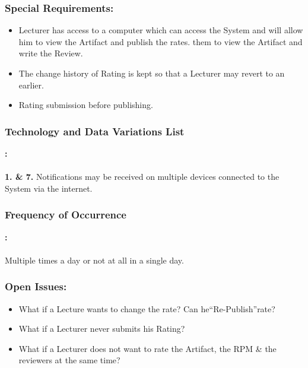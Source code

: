 \subsubsection*{Special Requirements:}
    \begin{itemize}
    \itemsep-1em 
       \item Lecturer has access to a computer which can access the System and will allow him to view the Artifact and publish the rates.
         them to view the Artifact and write the Review.
       \item The change history of Rating is kept so that a Lecturer may revert to an earlier.
       \item Rating submission before publishing.
    \end{itemize}
     

     \subsubsection*{Technology and Data Variations List}\textbf{:}
     \\
     \\
     \textbf{1. \& 7.} Notifications may be received on multiple devices connected to the System via the internet.
      \\
     \subsubsection*{Frequency of Occurrence}\textbf{:}
     \\
     \\
     Multiple times a day or not at all in a single day. 
     
     
     
     \subsubsection*{Open Issues:}
    \begin{itemize}
    \itemsep-1em 
       \item What if a Lecture wants to change the rate? Can he“Re-Publish”rate?
       \item What if a Lecturer never submits his Rating?
       \item What if a Lecturer does not want to rate the Artifact, the RPM \& the reviewers at the same time?
    \end{itemize}
    
    
    
    
    
